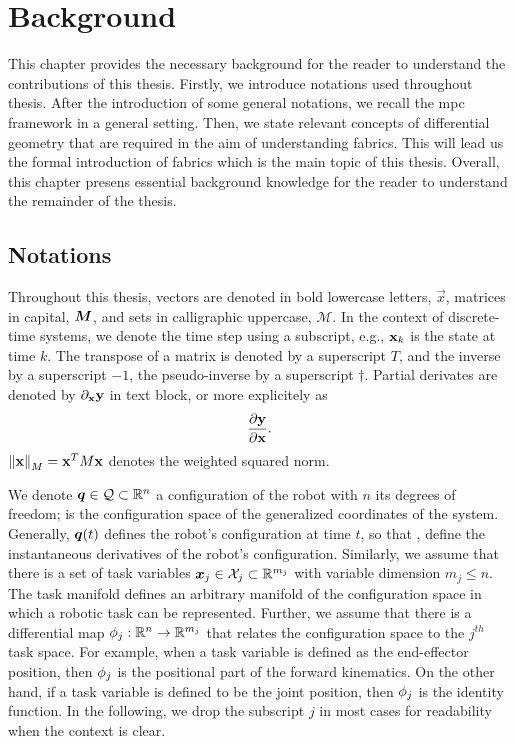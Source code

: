 \chapter{Background} %
\label{cha:background}

This chapter provides the necessary background for the reader to understand the
contributions of this thesis. Firstly, we introduce
notations used throughout thesis.
After the introduction of some general notations, we recall the
\ac{mpc} framework in a general setting. Then, we state
relevant concepts of differential geometry that are required
in the aim of understanding \ac{fabrics}. This will lead us
the formal introduction of \ac{fabrics} which is the main
topic of this thesis. Overall, this chapter presens essential
background knowledge for the reader to understand the
remainder of the thesis. 

\section{Notations} %
\label{sec:notations}

Throughout this thesis, vectors are denoted in bold lowercase
letters, $\vec{x}$, matrices in capital, $\bm{M}$, and sets
in calligraphic uppercase, $\mathcal{M}$. In the context of
discrete-time systems, we denote the time step using a
subscript, e.g., $\mathbf{x}_k$ is the state at time $k$. The
transpose of a matrix is denoted by a superscript $T$, and
the inverse by a superscript $-1$, the pseudo-inverse by a
superscript $\dagger$. Partial derivates are denoted by 
$\partial_{\mathbf{x}}\mathbf{y}$ in text block, or more explicitely as
\[\frac{\partial\mathbf{y}}{\partial\mathbf{x}}.\]
 $\left\lVert\mathbf{x}\right\rVert_M = \mathbf{x}^TM\mathbf{x}$
denotes the weighted squared norm. 


We denote $\bm{q}\in\mathcal{Q}\subset\mathbb{R}^n$ a configuration of the robot
with $n$ its degrees of freedom; \Q{} is the configuration
space of the generalized coordinates of the system.
Generally, $\bm{q}(t)$ defines the robot's configuration at time
$t$, so that \qdot, \qddot{} define the instantaneous
derivatives of the robot's configuration. Similarly, we
assume that there is a set of task variables
$\bm{x}_j\in\mathcal{X}_j\subset\mathbb{R}^{m_j}$ with variable dimension $m_j \leq n$.
The task manifold \Xj{} defines an arbitrary manifold of the
configuration space \Q{} in which a robotic task can be
represented. Further, we assume that there is a differential
map $\phi_j:\mathbb{R}^n\rightarrow\mathbb{R}^{m_j}$ that relates the
configuration space to the $j^{th}$ task space. For example,
when a task variable is defined as the end-effector
position, then $\phi_j$ is the positional part of the
forward kinematics. On the other hand, if a task variable is
defined to be the joint position, then $\phi_j$ is the
identity function. In the following, we drop the subscript
$j$ in most cases for readability when the context is clear.

